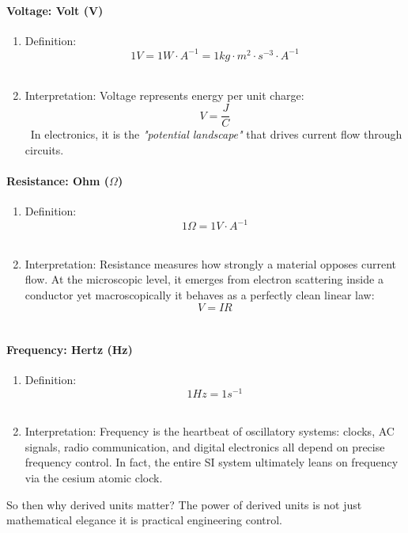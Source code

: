 \documentclass[../main.tex]{subfiles}
\begin{document}
\paragraph{Voltage: Volt (V)}

\begin{enumerate}[label=\textbf{-}]
	\item Definition:
	\[ 1 \unit{V} = 1 \unit{W} \cdot \unit{A}^{-1} = 1 \unit{kg} \cdot \unit{m}^{2} \cdot \unit{s}^{-3} \cdot \unit{A}^{-1} \]\
	\item Interpretation: Voltage represents energy per unit charge:
	\[ V = \frac{J}{C}\]\
	In electronics, it is the \textit{"potential landscape"} that drives current flow through circuits.\\
\end{enumerate}


\paragraph{Resistance: Ohm ($\Omega$)}

\begin{enumerate}[label=\textbf{-}]
	\item Definition: 
	\[ 1 \unit{\Omega} = 1 \unit{V} \cdot \unit{A}^{-1} \]\
	\item Interpretation: Resistance measures how strongly a material opposes current flow. At the microscopic level, it emerges from electron scattering inside a conductor yet macroscopically it behaves as a perfectly clean linear law: 
	\[ V = IR\]\
\end{enumerate}



\paragraph{Frequency: Hertz (Hz)}

\begin{enumerate}[label=\textbf{-}]
	\item Definition:
	\[ 1 \unit{Hz} = 1 \unit{s}^{-1}\]\
	\item Interpretation: Frequency is the heartbeat of oscillatory systems: clocks, AC signals, radio communication, and digital electronics all depend on precise frequency control. In fact, the entire SI system ultimately leans on frequency via the cesium atomic clock.\\
\end{enumerate}

So then why derived units matter? The power of derived units is not just mathematical elegance it is practical engineering control. 
\end{document}
